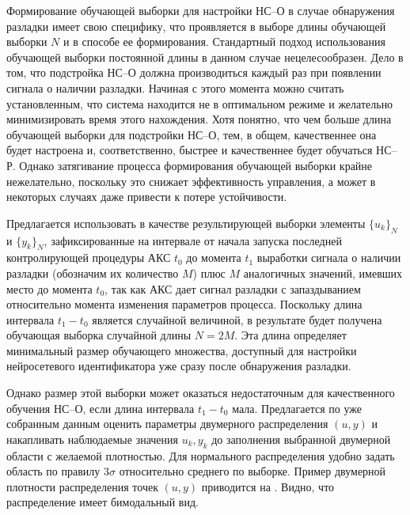 
Формирование обучающей выборки для настройки НС--О в случае обнаружения
разладки имеет свою специфику, что проявляется в выборе длины
обучающей выборки $N$ и в способе ее формирования. Стандартный подход
использования обучающей выборки постоянной длины в данном случае
нецелесообразен.  Дело в том, что подстройка НС--О должна производиться
каждый раз при появлении сигнала о наличии разладки.  Начиная с этого
момента можно считать установленным, что система находится не в
оптимальном режиме и желательно минимизировать время этого нахождения.
Хотя понятно, что чем больше длина обучающей выборки для подстройки
НС--О, тем, в общем, качественнее она будет настроена и,
соответственно, быстрее и качественнее будет обучаться НС--Р.  Однако
затягивание процесса формирования обучающей выборки крайне
нежелательно, поскольку это снижает эффективность управления, а может
в некоторых случаях даже привести к потере устойчивости.

Предлагается использовать в качестве результирующей выборки элементы
$\{u_k\}_N$ и $\{y_k\}_N$, зафиксированные на интервале от начала
запуска последней контролирующей процедуры АКС $t_0$ до момента $t_1$
выработки сигнала о наличии разладки (обозначим их количество $M$)
плюс $M$ аналогичных значений, имевших место до момента $t_0$, так как
АКС дает сигнал разладки с запаздыванием относительно момента
изменения параметров процесса.  Поскольку длина интервала $t_1-t_0$
является случайной величиной, в результате будет получена обучающая
выборка случайной длины $N=2M$.  Эта длина определяет минимальный
размер обучающего множества, доступный для настройки нейросетевого
идентификатора уже сразу после обнаружения разладки.

Однако размер этой выборки может оказаться недостаточным для
качественного обучения НС--О, если длина интервала $t_1-t_0$ мала.
Предлагается по уже собранным данным оценить параметры двумерного
распределения $(u,y)$ и накапливать наблюдаемые значения $u_k,y_k$ до
заполнения выбранной двумерной области с желаемой плотностью.  Для
нормального распределения удобно задать область по правилу $3\sigma$
относительно среднего по выборке.  Пример двумерной плотности
распределения точек $(u,y)$ приводится на .
Видно, что распределение имеет бимодальный вид.

